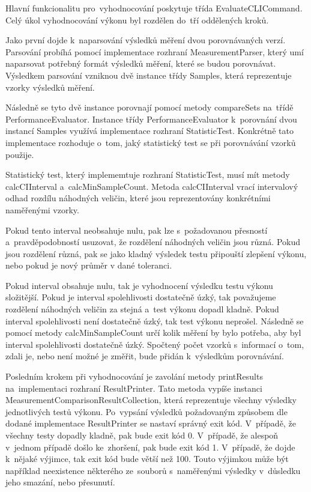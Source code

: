 Hlavní funkcionalitu pro~vyhodnocování poskytuje třída EvaluateCLICommand. Celý úkol vyhodnocování výkonu
byl rozdělen do~tří oddělených kroků.

Jako první dojde k~naparsování výsledků měření dvou porovnávaných verzí. Parsování probíhá pomocí
implementace rozhraní MeasurementParser, který umí naparsovat potřebný formát výsledků měření, které
se budou porovnávat. Výsledkem parsování vzniknou dvě instance třídy Samples, která reprezentuje vzorky
výsledků měření.

Následně se tyto dvě instance porovnají pomocí metody compareSets na~třídě PerformanceEvaluator. Instance třídy
PerformanceEvaluator k~porovnání dvou instancí Samples využívá implementace rozhraní StatisticTest. Konkrétně
tato implementace rozhoduje o~tom, jaký statistický test se při porovnávání vzorků použije.

Statistický test, který implememtuje rozhraní StatisticTest, musí mít metody calcCIInterval a~calcMinSampleCount.
Metoda calcCIInterval vrací intervalový odhad rozdílu náhodných veličin, které jsou reprezentovány konkrétními
naměřenými vzorky.

Pokud tento interval neobsahuje nulu, pak lze s~požadovanou přesností a~pravděpodobností usuzovat,
že rozdělení náhodných veličin jsou různá. Pokud jsou rozdělení různá, pak se jako kladný výsledek testu připouští
zlepšení výkonu, nebo pokud je nový průměr v dané toleranci.

Pokud interval obsahuje nulu, tak je vyhodnocení výsledku testu výkonu složitější. Pokud je interval spolehlivosti
dostatečně úzký, tak považujeme rozdělení náhodných veličin za stejná a~test výkonu dopadl kladně. Pokud interval
spolehlivosti není dostatečně úzký, tak test výkonu neprošel. Následně se pomocí metody calcMinSampleCount určí
kolik měření by bylo potřeba, aby byl interval spolehlivosti dostatečně úzký. Spočtený počet vzorků s~informací o~tom,
zdali je, nebo není možné je změřit, bude přidán k~výsledkům porovnávání.

Posledním krokem při vyhodnocování je zavolání metody printResults na~implementaci rozhraní ResultPrinter. Tato metoda
vypíše instanci MeasurementComparisonResultCollection, která reprezentuje všechny výsledky jednotlivých testů výkonu.
Po~vypsání výsledků požadovaným způsobem dle dodané implementace ResultPrinter se nastaví správný exit kód. V~případě,
že všechny testy dopadly kladně, pak bude exit kód 0. V~případě, že alespoň v~jednom případě došlo ke~zhoršení, pak bude
exit kód 1. V~případě, že dojde k~nějaké výjimce, tak exit kód bude větší než 100. Touto výjimkou může být například
neexistence některého ze~souborů s~naměřenými výsledky v~důsledku jeho smazání, nebo přesunutí.

